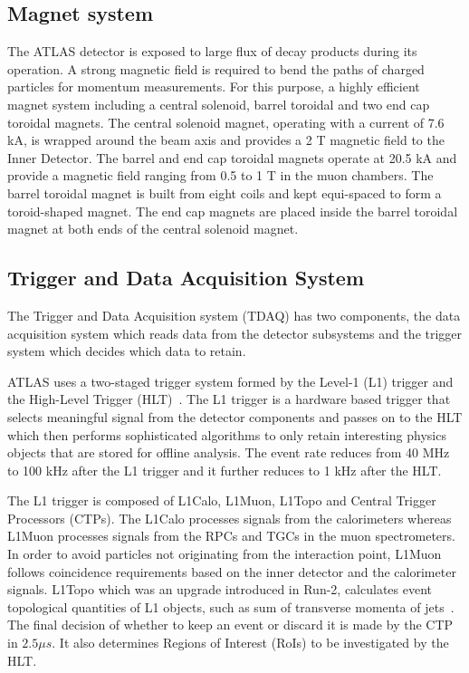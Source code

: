 \subsection{Magnet system}
The ATLAS detector is exposed to large ﬂux of decay products during its operation. A strong magnetic
ﬁeld is required to bend the paths of charged particles for momentum measurements. For this purpose,
a highly eﬃcient magnet system including a central solenoid, barrel toroidal and two end cap toroidal
magnets. The central solenoid magnet, operating with a current of 7.6 kA, is wrapped around the beam
axis and provides a 2 T magnetic ﬁeld to the Inner Detector. The barrel and end cap toroidal magnets
operate at 20.5 kA and provide a magnetic ﬁeld ranging from 0.5 to 1 T in the muon chambers. The
barrel toroidal magnet is built from eight coils and kept equi-spaced to form a toroid-shaped magnet.
The end cap magnets are placed inside the barrel toroidal magnet at both ends of the central solenoid
magnet.

\subsection{Trigger and Data Acquisition System}
The Trigger and Data Acquisition system (TDAQ) has two components, the data acquisition system which reads data
from the detector subsystems and the trigger system which decides which data to retain.
 
ATLAS uses a two-staged trigger system formed by the Level-1 (L1) trigger and the High-Level Trigger (HLT)~\cite{The-ATLAS-collaboration_2020}. The
L1 trigger is a hardware based trigger that selects meaningful signal from the detector components and passes on 
to the HLT which then performs sophisticated algorithms to only retain interesting physics objects 
that are stored for offline analysis. The event rate reduces from 40 MHz to 100 kHz after the L1 trigger and 
it further reduces to 1 kHz after the HLT.

The L1 trigger is composed of L1Calo, L1Muon, L1Topo and Central Trigger Processors (CTPs). The L1Calo processes
signals from the calorimeters whereas L1Muon processes signals from the RPCs and TGCs in the muon spectrometers. 
In order to avoid particles not originating from the interaction point, L1Muon follows coincidence requirements 
based on the inner detector and the calorimeter signals. L1Topo which was an upgrade introduced in Run-2, calculates
event topological quantities of L1 objects, such as sum of transverse momenta of jets~\cite{Nakahama_2015}. The final decision of 
whether to keep an event or discard it is made by the CTP in $2.5 \mu s$. It also determines Regions of Interest (RoIs)
to be investigated by the HLT.

